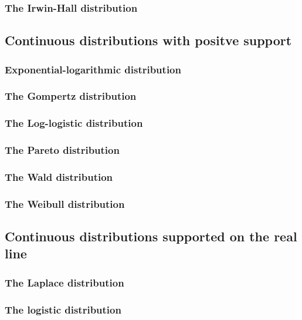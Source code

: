 \subsubsection{The Irwin-Hall distribution}

\subsection{Continuous distributions with positve support}

\subsubsection{Exponential-logarithmic distribution}

\subsubsection{The Gompertz distribution}

\subsubsection{The Log-logistic distribution}

\subsubsection{The Pareto distribution}

\subsubsection{The Wald distribution}

\subsubsection{The Weibull distribution}

\subsection{Continuous distributions supported on the real line}

\subsubsection{The Laplace distribution}

\subsubsection{The logistic distribution}

